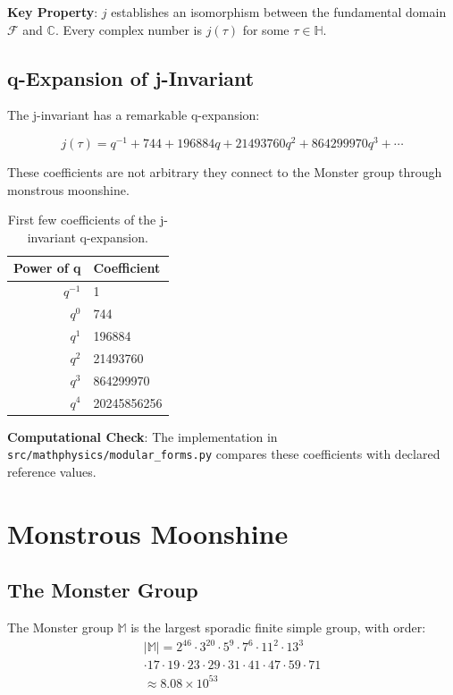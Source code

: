 \textbf{Key Property}: $j$ establishes an isomorphism between the fundamental domain $\mathcal{F}$ and $\mathbb{C}$. Every complex number is $j(\tau)$ for some $\tau \in \mathbb{H}$.

\subsection{q-Expansion of j-Invariant}

The j-invariant has a remarkable q-expansion:

\begin{equation}
    j(\tau) = q^{-1} + 744 + 196884q + 21493760q^2 + 864299970q^3 + \cdots
\end{equation}

These coefficients are not arbitrary they connect to the Monster group through monstrous moonshine.

\begin{table}[h]
\centering
\begin{tabular}{rl}
\toprule
Power of q & Coefficient \\
\midrule
$q^{-1}$ & 1 \\
$q^0$ & 744 \\
$q^1$ & 196884 \\
$q^2$ & 21493760 \\
$q^3$ & 864299970 \\
$q^4$ & 20245856256 \\
\bottomrule
\end{tabular}
\caption{First few coefficients of the j-invariant q-expansion.}
\label{tab:j_coefficients}
\end{table}

\textbf{Computational Check}: The implementation in \texttt{src/mathphysics/modular\_forms.py} compares these coefficients with declared reference values.

\section{Monstrous Moonshine}

\subsection{The Monster Group}

\begin{definition}
The Monster group $\mathbb{M}$ is the largest sporadic finite simple group, with order:
\begin{multline}
    |\mathbb{M}| = 2^{46} \cdot 3^{20} \cdot 5^9 \cdot 7^6 \cdot 11^2 \cdot 13^3 \\
    \cdot 17 \cdot 19 \cdot 23 \cdot 29 \cdot 31 \cdot 41 \cdot 47 \cdot 59 \cdot 71 \\
    \approx 8.08 \times 10^{53}
\end{multline}
\end{definition}

